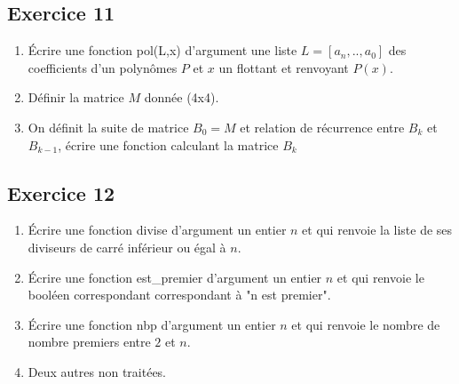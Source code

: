 \documentclass[10pt,fleqn]{article} %
\begin{document}
\begin{multicols}{2}
\subsection*{Exercice 11}
\begin{enumerate}
\item Écrire une fonction pol(L,x) d'argument une liste $L=[a_n,..,a_0]$ des 
coefficients d'un polynômes $P$ et $x$ un flottant et renvoyant $P(x)$.
\item Définir la matrice $M$ donnée (4x4).
\item On définit la suite de matrice $B_0=M$ et relation de récurrence entre $B_k$
et $B_{k-1}$, écrire une fonction calculant la matrice $B_k$
\end{enumerate}


\subsection*{Exercice 12}
\begin{enumerate}
\item Écrire une fonction divise d'argument un entier $n$ et qui renvoie la liste de 
ses diviseurs de carré inférieur ou égal à $n$.
\item Écrire une fonction est\_premier d'argument un entier $n$ et qui renvoie le booléen 
correspondant correspondant à "n est premier".
\item Écrire une fonction nbp d'argument un entier $n$ et qui renvoie le nombre de
 nombre premiers entre $2$ et $n$.
 \item Deux autres non traitées.
\end{enumerate}


\end{multicols}
\end{document}
